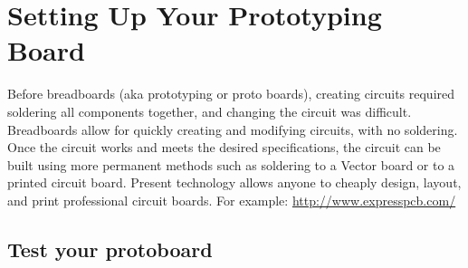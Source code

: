 \documentclass[10pt]{PhysLab1C} %
\begin{document}

\section{Setting Up Your Prototyping Board}

Before breadboards (aka prototyping or proto boards), creating circuits
required soldering all components together, and changing the circuit was
difficult. Breadboards allow for quickly creating and modifying
circuits, with no soldering. Once the circuit works and meets the
desired specifications, the circuit can be built using more permanent
methods such as soldering to a Vector board or to a printed circuit
board. Present technology allows anyone to cheaply design, layout, and
print professional circuit boards. For example:
\url{http://www.expresspcb.com/}

\subsection{Test your protoboard}
\end{document}

